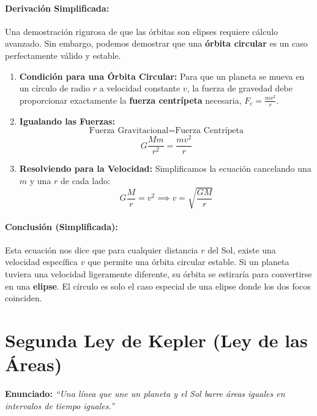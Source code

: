 \documentclass[11pt,a4paper]{book}
\begin{document}
\paragraph{Derivación Simplificada:}
Una demostración rigurosa de que las órbitas son elipses requiere cálculo avanzado. Sin embargo, podemos demostrar que una \textbf{órbita circular} es un caso perfectamente válido y estable.
\begin{enumerate}
    \item \textbf{Condición para una Órbita Circular:} Para que un planeta se mueva en un círculo de radio $r$ a velocidad constante $v$, la fuerza de gravedad debe proporcionar exactamente la \textbf{fuerza centrípeta} necesaria, $F_c = \frac{mv^2}{r}$.

    \item \textbf{Igualando las Fuerzas:}
    \[ \text{Fuerza Gravitacional} = \text{Fuerza Centrípeta} \]
    \[ G \frac{M m}{r^2} = \frac{m v^2}{r} \]

    \item \textbf{Resolviendo para la Velocidad:} Simplificamos la ecuación cancelando una $m$ y una $r$ de cada lado:
    \[ G \frac{M}{r} = v^2 \implies v = \sqrt{\frac{GM}{r}} \]
\end{enumerate}
\paragraph{Conclusión (Simplificada):} Esta ecuación nos dice que para cualquier distancia $r$ del Sol, existe una velocidad específica $v$ que permite una órbita circular estable. Si un planeta tuviera una velocidad ligeramente diferente, su órbita se estiraría para convertirse en una \textbf{elipse}. El círculo es solo el caso especial de una elipse donde los dos focos coinciden.

\section*{Segunda Ley de Kepler (Ley de las Áreas)}
\textbf{Enunciado:} \textit{“Una línea que une un planeta y el Sol barre áreas iguales en intervalos de tiempo iguales.”}
\end{document}

